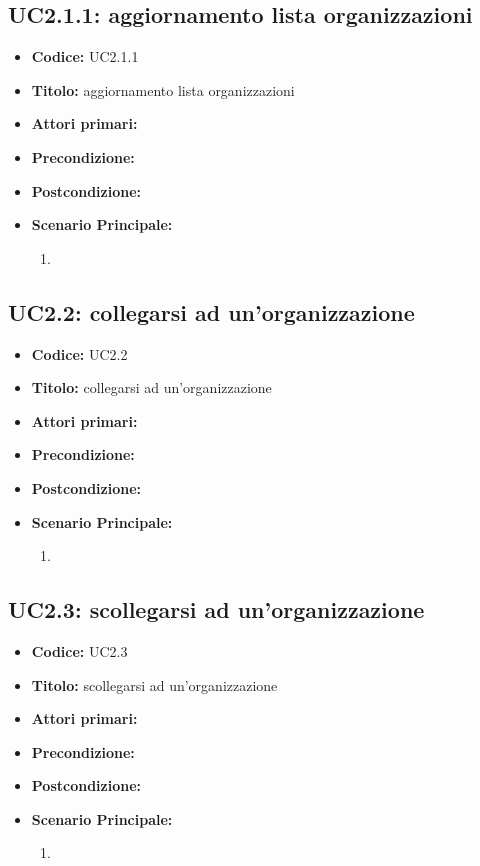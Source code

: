 ﻿\documentclass[../analisi-dei-requisiti]{subfiles}
\begin{document}
\subsection{UC2.1.1: aggiornamento lista organizzazioni}
\label{sub:uc2.1utente}
\begin{itemize}
  \item \textbf{Codice:} UC2.1.1
  \item \textbf{Titolo:} aggiornamento lista organizzazioni
  \item \textbf{Attori primari:}
  \item \textbf{Precondizione:}
  \item \textbf{Postcondizione:}
  \item \textbf{Scenario Principale:}
  \begin{enumerate}
    \item
  \end{enumerate}
\end{itemize}

\subsection{UC2.2: collegarsi ad un'organizzazione}
\label{sub:uc2.1utente}
\begin{itemize}
  \item \textbf{Codice:} UC2.2
  \item \textbf{Titolo:} collegarsi ad un'organizzazione
  \item \textbf{Attori primari:}
  \item \textbf{Precondizione:}
  \item \textbf{Postcondizione:}
  \item \textbf{Scenario Principale:}
  \begin{enumerate}
    \item
  \end{enumerate}
\end{itemize}

\subsection{UC2.3: scollegarsi ad un'organizzazione}
\label{sub:uc2.1utente}
\begin{itemize}
  \item \textbf{Codice:} UC2.3
  \item \textbf{Titolo:} scollegarsi ad un'organizzazione
  \item \textbf{Attori primari:}
  \item \textbf{Precondizione:}
  \item \textbf{Postcondizione:}
  \item \textbf{Scenario Principale:}
  \begin{enumerate}
    \item
  \end{enumerate}
\end{itemize}
\end{document}
